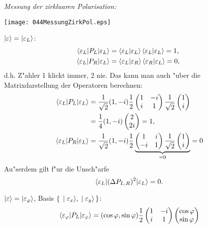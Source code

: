 \documentclass[a4paper]{scrartcl}
\begin{document}
{\emph{Messung der zirkluaren Polarisation:}
\begin{center}
\texttt{[image: 044MessungZirkPol.eps]}
\end{center}
\begin{1aufz}
\item $\ket {\varepsilon} = \ket{\varepsilon_L}$:
\begin{align*}
\braket{ \varepsilon_L | P_L | \varepsilon_L } & = \braket{\varepsilon_L | \varepsilon_L}\braket{\varepsilon_L | \varepsilon_L} = 1, \\
\braket{ \varepsilon_L | P_R | \varepsilon_L } & = \braket{\varepsilon_L | \varepsilon_R}\braket{\varepsilon_R | \varepsilon_L} = 0, \
\end{align*}
d.h. Z"ahler 1 klickt immer, 2 nie. Das kann man auch "uber die Matrixdarstellung der Operatoren berechnen:
\begin{align*}
\braket{ \varepsilon_L | P_L | \varepsilon_L } & = \frac1{\sqrt2} (1, -i) \frac12 \begin{pmatrix} 1 & -i \\ i & 1 \end{pmatrix} \frac1{\sqrt2} \begin{pmatrix} 1 \\ i \end{pmatrix} \\
& = \frac14 (1, -i) \begin{pmatrix} 2 \\ 2i \end{pmatrix} = 1, \\
\braket{ \varepsilon_L | P_R | \varepsilon_L } & = \frac1{\sqrt2} (1, -i) \frac12 \underbrace{\begin{pmatrix} 1 & i \\ -i & 1 \end{pmatrix} \frac1{\sqrt2} \begin{pmatrix} 1 \\ i \end{pmatrix}}_{=0} = 0 
\end{align*}
Au"serdem gilt f"ur die Unsch"arfe
$$\braket{ \varepsilon_L | (\Delta P_{L,R})^2 | \varepsilon_L } = 0. $$
\item $\ket {\varepsilon} = \ket { \varepsilon_\varphi}$, Basis $\set{ \ket{\ensuremath \varepsilon_x}, \ket{\ensuremath \varepsilon_y}}$:
\begin{align}
\begin{split}
\braket{ \eps_\phi | P_L | \eps_\phi } & = (\cos \phi, \sin \phi) \frac12 \begin{pmatrix} 1 & -i \\ i & 1 \end{pmatrix} \begin{pmatrix} \cos \phi \\ \sin \phi \end{pmatrix} \\

\end{split}
\end{align}
\end{1aufz}}
\end{document}
